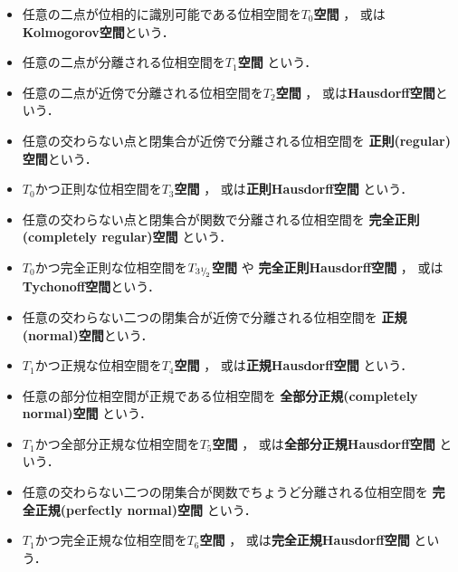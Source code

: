 	\begin{screen}
		\begin{dfn}[分離公理]\mbox{}
			\begin{itemize}
				\item 任意の二点が位相的に識別可能である位相空間を{\bf $T_0$空間}
					，
					或は{\bf Kolmogorov空間}という．
				\item 任意の二点が分離される位相空間を{\bf $T_1$空間}
					という．
				\item 任意の二点が近傍で分離される位相空間を{\bf $T_2$空間}
					，
					或は{\bf Hausdorff空間}という．
				\item 任意の交わらない点と閉集合が近傍で分離される位相空間を
					{\bf 正則(regular)空間}という．
				\item $T_0$かつ正則な位相空間を{\bf $T_3$空間}
					，
					或は{\bf 正則Hausdorff空間}
					という．
				\item 任意の交わらない点と閉集合が関数で分離される位相空間を
					{\bf 完全正則(completely regular)空間}
					という．
				\item $T_0$かつ完全正則な位相空間を{\bf $T_{3{}^1{\mskip -5mu/\mskip -3mu}_2}$空間}
					や
					{\bf 完全正則Hausdorff空間}
					，
					或は{\bf Tychonoff空間}という．
				\item 任意の交わらない二つの閉集合が近傍で分離される位相空間を
					{\bf 正規(normal)空間}という．
				\item $T_1$かつ正規な位相空間を{\bf $T_4$空間}
					，
					或は{\bf 正規Hausdorff空間}
					という．
				\item 任意の部分位相空間が正規である位相空間を
					{\bf 全部分正規(completely normal)空間}
					という．
				\item $T_1$かつ全部分正規な位相空間を{\bf $T_5$空間}
					，
					或は{\bf 全部分正規Hausdorff空間}
					という．
				\item 任意の交わらない二つの閉集合が関数でちょうど分離される位相空間を
					{\bf 完全正規(perfectly normal)空間}
					という．
				\item $T_1$かつ完全正規な位相空間を{\bf $T_6$空間}
					，
					或は{\bf 完全正規Hausdorff空間}
					という．
			\end{itemize}
		\end{dfn}
	\end{screen}
	
